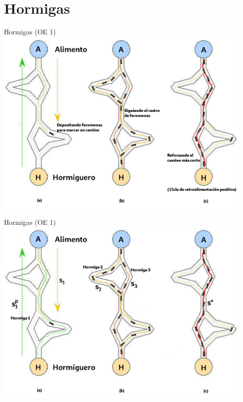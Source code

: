 \section{Hormigas}
\begin{frame}{Hormigas (OE 1)}
\includegraphics[width=0.95\textwidth]{Pictures/ACO-ant.png}
\end{frame}

\begin{frame}{Hormigas (OE 1)}
\centering
\includegraphics[width=0.95\textwidth]{Pictures/ACO-ant-2.png}
\end{frame}

